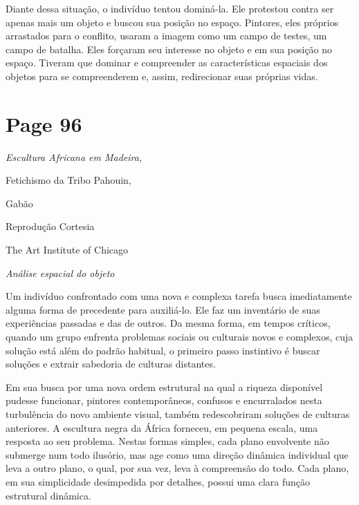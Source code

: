 \documentclass[a4paper]{article}
\begin{document}
Diante dessa situação, o indivíduo tentou dominá-la. Ele protestou contra ser apenas mais um objeto e buscou sua posição no espaço. Pintores, eles próprios arrastados para o conflito, usaram a imagem como um campo de testes, um campo de batalha. Eles forçaram seu interesse no objeto e em sua posição no espaço. Tiveram que dominar e compreender as características espaciais dos objetos para se compreenderem e, assim, redirecionar suas próprias vidas.


\newpage
\section*{Page 96}

{\itshape
Escultura Africana em Madeira, \par
Fetichismo da Tribo Pahouin, \par
Gabão \par
Reprodução Cortesia \par
The Art Institute of Chicago \par
}

\par %

{\centering\itshape
Análise espacial do objeto \par
}

\par %

Um indivíduo confrontado com uma nova e complexa tarefa busca imediatamente alguma forma de precedente para auxiliá-lo. Ele faz um inventário de suas experiências passadas e das de outros. Da mesma forma, em tempos críticos, quando um grupo enfrenta problemas sociais ou culturais novos e complexos, cuja solução está além do padrão habitual, o primeiro passo instintivo é buscar soluções e extrair sabedoria de culturas distantes.

\par %

Em sua busca por uma nova ordem estrutural na qual a riqueza disponível pudesse funcionar, pintores contemporâneos, confusos e encurralados nesta turbulência do novo ambiente visual, também redescobriram soluções de culturas anteriores. A escultura negra da África forneceu, em pequena escala, uma resposta ao seu problema. Nestas formas simples, cada plano envolvente não submerge num todo ilusório, mas age como uma direção dinâmica individual que leva a outro plano, o qual, por sua vez, leva à compreensão do todo. Cada plano, em sua simplicidade desimpedida por detalhes, possui uma clara função estrutural dinâmica.
\end{document}
